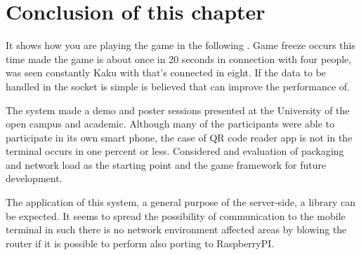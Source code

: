 \section{Conclusion of this chapter}
It shows how you are playing the game in the following .
Game freeze occurs this time made the game is about once in 20 seconds in connection with four people, was seen constantly Kaku with that's connected in eight. If the data to be handled in the socket is simple is believed that can improve the performance of.

The system made a demo and poster sessions presented at the University of the open campus and academic. Although many of the participants were able to participate in its own smart phone, the case of QR code reader app is not in the terminal occurs in one percent or less.
Considered and evaluation of packaging and network load as the starting point and the game framework for future development.


The application of this system, a general purpose of the server-side, a library can be expected.
It seems to spread the possibility of communication to the mobile terminal in such there is no network environment affected areas by blowing the router if it is possible to perform also porting to RaspberryPI.


\newpage
